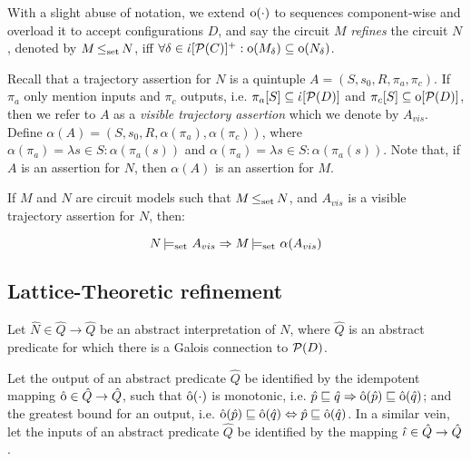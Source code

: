 
With a slight abuse of notation, we extend $\operatorname{\mathrm{o}}(\cdot)$ to sequences component-wise and overload it to accept configurations $D$, and say the circuit $M$ \textit{refines} the circuit $N$, denoted by $M \operatorname{\leq_{\textrm{set}}} N$, iff $\forall \delta \in \operatorname{\dot{\iota}}[\mathcal{P}(C)]^{+} : \operatorname{\mathrm{o}}(M_{\delta}) \subseteq \operatorname{\mathrm{o}}(N_{\delta})$.

Recall that a trajectory assertion for $N$ is a quintuple $A = (S,s_{0},R,\pi_{a},\pi_{c})$. If $\pi_{a}$ only mention inputs and $\pi_{c}$ outputs, i.e. $\pi_{a}[S] \subseteq \operatorname{\dot{\iota}}[\mathcal{P}(D)]$ and $\pi_{c}[S] \subseteq \operatorname{\mathrm{o}}[\mathcal{P}(D)]$, then we refer to $A$ as a \textit{visible trajectory assertion} which we denote by $A_{vis}$. Define $\alpha(A) = (S, s_{0}, R, \alpha(\pi_{a}), \alpha(\pi_{c}))$, where $\alpha(\pi_{a}) = \lambda s \in S : \alpha(\pi_{a}(s))$ and $\alpha(\pi_{a}) = \lambda s \in S : \alpha(\pi_{a}(s))$. Note that, if $A$ is an assertion for $N$, then $\alpha(A)$ is an assertion for $M$.

\begin{theorem} \label{thm:refinement-set}
If $M$ and $N$ are circuit models such that $M \operatorname{\leq_{\textrm{set}}} N$, and $A_{vis}$ is a visible trajectory assertion for $N$, then:

\begin{equation*}
N \operatorname{\models_{\textrm{set}}} \, A_{vis} \Rightarrow M \operatorname{\models_{\textrm{set}}} \, \alpha(A_{vis})
\end{equation*}
\end{theorem}

\subsection{Lattice-Theoretic refinement}

Let $\hat N \in \hat Q \rightarrow \hat Q$ be an abstract interpretation of $N$, where $\hat Q$ is an abstract predicate for which there is a Galois connection to $\mathcal{P}(D)$.

Let the output of an abstract predicate $\hat Q$ be identified by the idempotent mapping $\operatorname{\hat{\mathrm{o}}} \in \hat Q \rightarrow \hat Q$, such that $\operatorname{\hat{\mathrm{o}}}(\cdot)$ is monotonic, i.e. $\hat p \sqsubseteq \hat q \Rightarrow \operatorname{\hat{\mathrm{o}}}(\hat p) \sqsubseteq \operatorname{\hat{\mathrm{o}}}(\hat q)$; and the greatest bound for an output, i.e. $\operatorname{\hat{\mathrm{o}}}(\hat p) \sqsubseteq \operatorname{\hat{\mathrm{o}}}(\hat q) \Leftrightarrow \hat p \sqsubseteq \operatorname{\hat{\mathrm{o}}}(\hat q)$. In a similar vein, let the inputs of an abstract predicate $\hat Q$ be identified by the mapping $\operatorname{\hat{\iota}} \in \hat Q \rightarrow \hat Q$.

